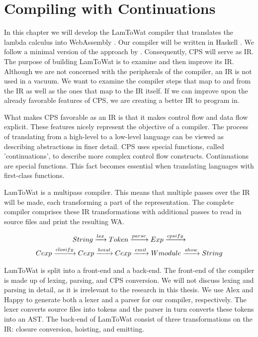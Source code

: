
\chapter{\label{chap:cpscomp}Compiling with Continuations}
In this chapter we will develop the LamToWat compiler that translates the lambda calculus into WebAssembly \autocite{webassemblyhomepage}. Our compiler will be written in Haskell \autocite{haskellhomepage}. We follow a minimal version of the approach by \citeauthor{DBLP:books/daglib/0022396}. Consequently, \ac{CPS} will serve as \ac{IR}. The purpose of building LamToWat is to examine and then improve its \ac{IR}. Although we are not concerned with the peripherals of the compiler, an \ac{IR} is not used in a vacuum. We want to examine the compiler steps that map to and from the \ac{IR} as well as the ones that map to the \ac{IR} itself. If we can improve upon the already favorable features of \ac{CPS}, we are creating a better IR to program in.

What makes \ac{CPS} favorable as an \ac{IR} is that it makes control flow and data flow explicit. These features nicely represent the objective of a compiler. The process of translating from a high-level to a low-level language can be viewed as describing abstractions in finer detail. \ac{CPS} uses special functions, called 'continuations', to describe more complex control flow constructs. Continuations are special functions. This fact becomes essential when translating languages with first-class functions.

LamToWat is a multipass compiler. This means that multiple passes over the \ac{IR} will be made, each transforming a part of the representation. The complete compiler comprises these \ac{IR} transformations with additional passes to read in source files and print the resulting \ac{WA}.

\begin{gather*}
  String \xrightarrow{lex} Token \xrightarrow{parse} Exp \xrightarrow{cpsify}\\
  Cexp \xrightarrow{closify} Cexp \xrightarrow{hoist} Cexp \xrightarrow{emit} Wmodule \xrightarrow{show} String
\end{gather*}

LamToWat is split into a front-end and a back-end. The front-end of the compiler is made up of lexing, parsing, and \ac{CPS} conversion. We will not discuss lexing and parsing in detail, as it is irrelevant to the research in this thesis. We use Alex \autocite{haskellalex} and Happy \autocite{haskellhappy} to generate both a lexer and a parser for our compiler, respectively. The lexer converts source files into tokens and the parser in turn converts these tokens into an \ac{AST}. The back-end of LamToWat consist of three transformations on the \ac{IR}: closure conversion, hoisting, and emitting.

